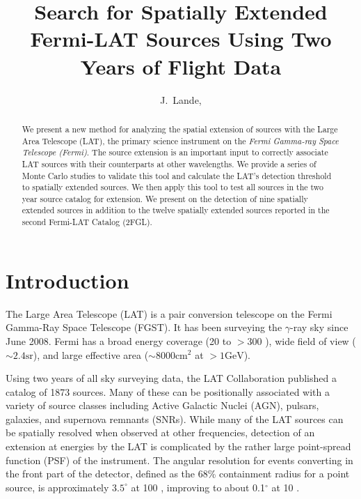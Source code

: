 \documentclass[12pt,preprint]{aastex}
\newcommand{\mev}{\text{MeV}\xspace}
\newcommand{\gev}{\text{GeV}\xspace}
\newcommand{\sr}{\text{sr}\xspace}
\newcommand{\cm}{\text{cm}\xspace}
\renewcommand{\approx}{\sim\!\xspace}
\begin{document}
\title{Search for Spatially Extended Fermi-LAT Sources Using Two Years of Flight
Data}

\author{
J.~Lande, 
}


\begin{abstract}
We present a new method for analyzing 
the spatial extension of sources with
the Large Area Telescope (LAT), the primary science instrument on the
{\em Fermi Gamma-ray Space Telescope (Fermi)}. 
The source extension is an important input to correctly 
associate LAT sources with their counterparts at other
wavelengths. We provide
a series of Monte Carlo studies to validate this tool and calculate
the LAT's detection threshold to spatially extended sources.  We then
apply this tool to test all sources in the two year source catalog for
extension. We present on the detection of nine spatially extended sources
in addition to the twelve spatially extended sources reported in the
second Fermi-LAT Catalog (2FGL).
\end{abstract}

\listoftodos

\section{Introduction}

The Large Area Telescope (LAT) is a pair conversion telescope on the Fermi
Gamma-Ray Space Telescope (FGST). It has been surveying the $\gamma$-ray
sky since June 2008.  Fermi has a broad energy coverage (20 \mev to $>300$
\gev), wide field of view ($\approx 2.4 \sr$), and large effective area
($\approx 8000 \cm^2$ at $>1 \gev$).

Using two years of all sky surveying data, the LAT Collaboration published
a catalog of 1873 \gev sources\cite{second_cat}. Many of these can be
positionally associated with a variety of source classes including Active
Galactic Nuclei (AGN), pulsars, galaxies, and supernova remnants (SNRs).
While many of the LAT sources can be spatially resolved when observed
at other frequencies, detection of an extension at \gev energies by
the LAT is complicated by the rather large point-spread function (PSF)
of the instrument. The angular resolution for events converting in the
front part of the detector, defined as the 68\% containment radius for
a point source, is approximately $3.5^{\circ}$ at 100 \mev, improving
to about 0.1$^{\circ}$ at 10 \gev.
\end{document}
